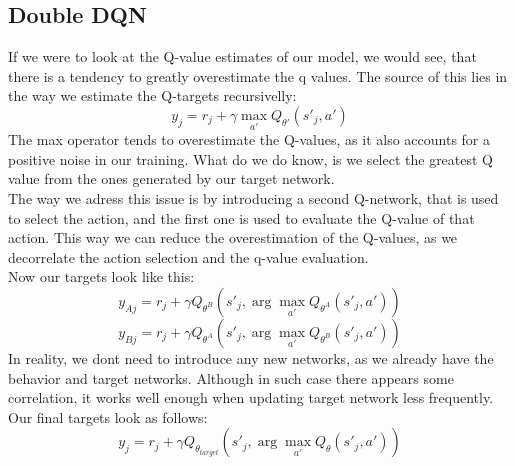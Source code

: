 \documentclass[a4paper,12pt]{article}
\begin{document}
\subsection{Double DQN}
If we were to look at the Q-value estimates of our model, we would see, that there is a tendency to greatly overestimate the q values. The source of this lies in the way we estimate the Q-targets recursivelly:
\[
y_j = r_j + \gamma \max_{a'} Q_{\theta'}(s'_j, a')
\]
The max operator tends to overestimate the Q-values, as it also accounts for a positive noise in our training. What do we do know, is we select the greatest Q value from the ones generated by our target network.\\
The way we adress this issue is by introducing a second Q-network, that is used to select the action, and the first one is used to evaluate the Q-value of that action. This way we can reduce the overestimation of the Q-values, as we decorrelate the action selection and the q-value evaluation.
\\Now our targets look like this:
\[
y_{Aj} = r_j + \gamma Q_{\theta^B}(s'_j, \arg\max_{a'} Q_{\theta^A}(s'_j, a'))
\]
\[
y_{Bj} = r_j + \gamma Q_{\theta^A}(s'_j, \arg\max_{a'} Q_{\theta^B}(s'_j, a'))
\]
In reality, we dont need to introduce any new networks, as we already have the behavior and target networks.
Although in such case there appears some correlation, it works well enough when updating target network less frequently.
\\ Our final targets look as follows:
\[
y_j = r_j + \gamma Q_{\theta_{target}}(s'_j, \arg\max_{a'} Q_{\theta}(s'_j, a'))
\]
\end{document}
